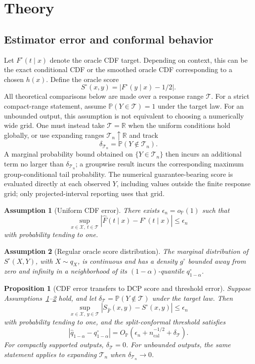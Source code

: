\documentclass[11pt]{article}
\newtheorem{assumption}{Assumption}
\newtheorem{proposition}{Proposition}
\newcommand{\Xcal}{\mathcal X}
\newcommand{\Tcal}{\mathcal T}
\newcommand{\Pp}{\mathbb P}
\newcommand{\R}{\mathbb R}
\newcommand{\abs}[1]{\left\lvert #1 \right\rvert}
\newcommand{\op}{o_{\mathbb P}}
\newcommand{\Op}{O_{\mathbb P}}
\begin{document}
\section{Theory}
\label{sec:theory}

\subsection{Estimator error and conformal behavior}

Let \(F^\circ(t\mid x)\) denote the oracle CDF target. Depending on context, this can be the exact conditional CDF or the smoothed oracle CDF corresponding to a chosen \(h(x)\). Define the oracle score
\[
  S^\circ(x,y)=\abs{F^\circ(y\mid x)-1/2}.
\]
All theoretical comparisons below are made over a response range \(\Tcal\). For a strict compact-range statement, assume \(\Pp(Y\in\Tcal)=1\) under the target law. For an unbounded output, this assumption is not equivalent to choosing a numerically wide grid. One must instead take \(\Tcal=\R\) when the uniform conditions hold globally, or use expanding ranges \(\Tcal_n\uparrow\R\) and track
\[
  \delta_{\Tcal_n}=\Pp(Y\notin\Tcal_n).
\]
A marginal probability bound obtained on \(\{Y\in\Tcal_n\}\) then incurs an additional term no larger than \(\delta_{\Tcal_n}\); a groupwise result incurs the corresponding maximum group-conditional tail probability. The numerical guarantee-bearing score is evaluated directly at each observed \(Y\), including values outside the finite response grid; only projected-interval reporting uses that grid.

\begin{assumption}[Uniform CDF error]
\label{ass:uniform}
There exists \(\epsilon_n=\op(1)\) such that
\[
  \sup_{x\in\Xcal,\ t\in\Tcal}
  \abs{\widehat F(t\mid x)-F^\circ(t\mid x)}
  \le \epsilon_n
\]
with probability tending to one.
\end{assumption}

\begin{assumption}[Regular oracle score distribution]
\label{ass:score}
The marginal distribution of \(S^\circ(X,Y)\), with \(X\sim q_X\), is continuous and has a density \(g^\circ\) bounded away from zero and infinity in a neighborhood of its \((1-\alpha)\)-quantile \(q^\circ_{1-\alpha}\).
\end{assumption}

\begin{proposition}[CDF error transfers to DCP score and threshold error]
\label{prop:error-transfer}
Suppose Assumptions~\ref{ass:uniform}--\ref{ass:score} hold, and let
\(\delta_{\Tcal}=\Pp(Y\notin\Tcal)\) under the target law. Then
\[
  \sup_{x\in\Xcal,\ y\in\Tcal}
  \abs{S_{\widehat F}(x,y)-S^\circ(x,y)}
  \le \epsilon_n
\]
with probability tending to one, and the split-conformal threshold satisfies
\[
  \abs{\widehat q_{1-\alpha}-q^\circ_{1-\alpha}}
  =
  \Op\!\left(
  \epsilon_n+n_{\mathrm{cal}}^{-1/2}+\delta_{\Tcal}
  \right).
\]
For compactly supported outputs, \(\delta_{\Tcal}=0\). For unbounded outputs,
the same statement applies to expanding \(\Tcal_n\) when
\(\delta_{\Tcal_n}\to0\).
\end{proposition}
\end{document}
